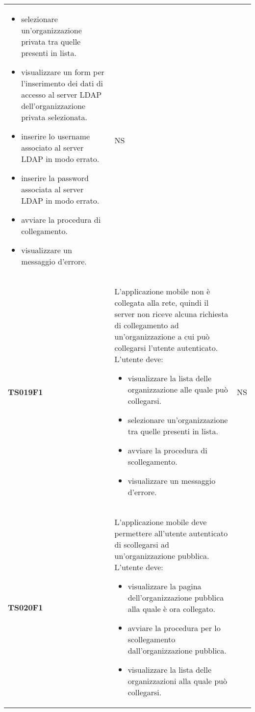 \documentclass[../piano-di-qualifica.tex]{subfiles}
\begin{document}
\begin{centering}
\begin{longtable}[H]{>{\centering\bfseries}m{3cm} >{}p{10cm} >{\centering\arraybackslash}m{3cm}}
\begin{itemize}
                        \item selezionare un'organizzazione privata tra quelle presenti in lista.
                        \item visualizzare un form per l'inserimento dei dati di accesso al server LDAP dell'organizzazione privata selezionata.
                        \item inserire lo username associato al server LDAP in modo errato.
                        \item inserire la password associata al server LDAP in modo errato.
                        \item avviare la procedura di collegamento.
                        \item visualizzare un messaggio d'errore.
                      \end{itemize}
                    & NS \\
        TS019F1     & L'applicazione mobile non è collegata alla rete, quindi il server non riceve alcuna richiesta di collegamento ad un'organizzazione a cui può collegarsi l'utente autenticato. \newline
                    L'utente deve:
                    \begin{itemize}
                      \item visualizzare la lista delle organizzazione alle quale può collegarsi.
                      \item selezionare un'organizzazione tra quelle presenti in lista.
                      \item avviare la procedura di scollegamento.
                      \item visualizzare un messaggio d'errore.
                    \end{itemize}
                    & NS \\
        TS020F1     & L'applicazione mobile deve permettere all'utente autenticato di scollegarsi ad un'organizzazione pubblica. \newline
                      L'utente deve:
                      \begin{itemize}
                        \item visualizzare la pagina dell'organizzazione pubblica alla quale è ora collegato.
                        \item avviare la procedura per lo scollegamento dall'organizzazione pubblica.
                        \item visualizzare la lista delle organizzazioni alla quale può collegarsi.

\end{itemize}
\end{longtable}
\end{centering}
\end{document}
